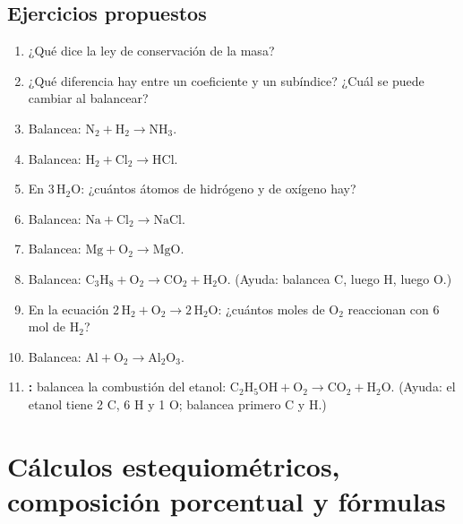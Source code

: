 \documentclass[12pt, letterpaper]{article}
\begin{document}
\subsection{Ejercicios propuestos}

\begin{enumerate}[leftmargin=*, resume]
  \item \facil{} ¿Qué dice la ley de conservación de la masa?

  \item \facil{} ¿Qué diferencia hay entre un coeficiente y un subíndice? ¿Cuál se puede cambiar al balancear?

  \item \facil{} Balancea: $\text{N}_2 + \text{H}_2 \rightarrow \text{NH}_3$.

  \item \facil{} Balancea: $\text{H}_2 + \text{Cl}_2 \rightarrow \text{HCl}$.

  \item \facil{} En $3\,\text{H}_2\text{O}$: ¿cuántos átomos de hidrógeno y de oxígeno hay?

  \item \medio{} Balancea: $\text{Na} + \text{Cl}_2 \rightarrow \text{NaCl}$.

  \item \medio{} Balancea: $\text{Mg} + \text{O}_2 \rightarrow \text{MgO}$.

  \item \medio{} Balancea: $\text{C}_3\text{H}_8 + \text{O}_2 \rightarrow \text{CO}_2 + \text{H}_2\text{O}$. (Ayuda: balancea C, luego H, luego O.)

  \item \medio{} En la ecuación $2\,\text{H}_2 + \text{O}_2 \rightarrow 2\,\text{H}_2\text{O}$: ¿cuántos moles de $\text{O}_2$ reaccionan con 6 mol de $\text{H}_2$?

  \item \dificil{} Balancea: $\text{Al} + \text{O}_2 \rightarrow \text{Al}_2\text{O}_3$.

  \item \dificil{} \textbf{:} balancea la combustión del etanol: $\text{C}_2\text{H}_5\text{OH} + \text{O}_2 \rightarrow \text{CO}_2 + \text{H}_2\text{O}$. (Ayuda: el etanol tiene 2 C, 6 H y 1 O; balancea primero C y H.)
\end{enumerate}

\newpage

\section{Cálculos estequiométricos, composición porcentual y fórmulas}
\end{document}
